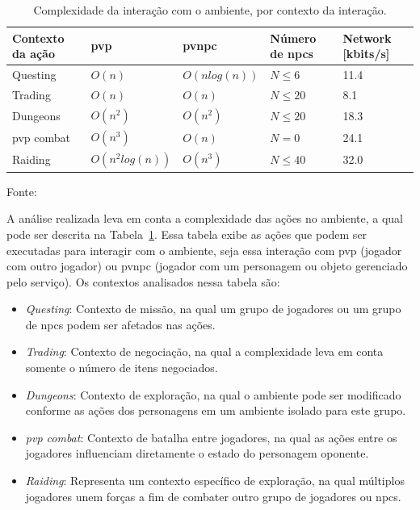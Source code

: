 \begin{table}[htb!]
\centering
\caption{Complexidade da interação com o ambiente, por contexto da interação.}
\label{tab:complexidade}
\begin{tabular}{l|l|l|l|l}
\hline \hline
Contexto da ação        & \ac{pvp}           & \ac{pvnpc}              & Número de \acp{npc}    & Network {[}kbits/s{]} \\ \hline \hline
Questing                & $O(n)$             & $O(n log(n))$           & $N \leq 6 $            & 11.4          \\ \hline
Trading                 & $O(n)$             & $O(n)$                  & $N \leq 20$            & 8.1           \\ \hline
Dungeons                & $O(n^2)$           & $O(n^2)$                & $N \leq 20$            & 18.3          \\ \hline
\ac{pvp} combat         & $O(n^3)$           & $O(n)$                  & $N = 0    $            & 24.1          \\ \hline
Raiding                 & $O(n^2 log(n))$    & $O(n^3)$                & $N \leq 40$            & 32.0          \\ \hline \hline
\end{tabular}

Fonte:~\cite{6374456}
\end{table}


A análise realizada leva em conta a complexidade das ações no ambiente, a qual pode ser descrita na Tabela~\ref{tab:complexidade}.
%
Essa tabela exibe as ações que podem ser executadas para interagir com o ambiente, seja essa interação com \ac{pvp} (jogador com outro jogador) ou \ac{pvnpc} (jogador com um personagem ou objeto gerenciado pelo serviço).
%
Os contextos analisados nessa tabela são:

\begin{itemize}
  \item \textit{Questing}: Contexto de missão, na qual um grupo de jogadores ou um grupo de \acp{npc} podem ser afetados nas ações.
  \item \textit{Trading}: Contexto de negociação, na qual a complexidade leva em conta somente o número de itens negociados.
  \item \textit{Dungeons}: Contexto de exploração, na qual o ambiente pode ser modificado conforme as ações dos personagens em um ambiente isolado para este grupo.
  \item \textit{\ac{pvp} combat}: Contexto de batalha entre jogadores, na qual as ações entre os jogadores influenciam diretamente o estado do personagem oponente.
  \item \textit{Raiding}: Representa um contexto específico de exploração, na qual múltiplos jogadores unem forças a fim de combater outro grupo de jogadores ou \acp{npc}.
\end{itemize}

